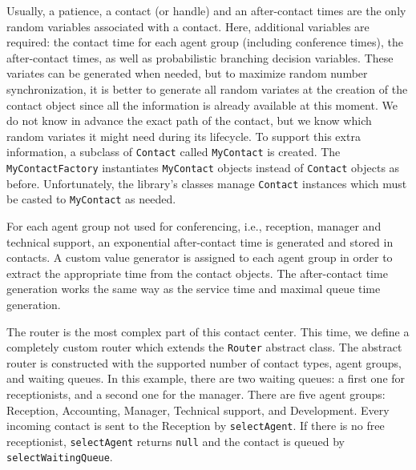 Usually, a patience, a contact (or handle) and an after-contact times
are the
only random variables associated with a contact.  Here, additional
variables are required: the contact time for each agent group
(including conference times), the
after-contact times, as well as probabilistic
branching decision variables.  These variates can be generated when
needed, but to maximize random number synchronization, it is better to
generate all random variates at the creation of the contact object
since all the information is already available at this moment.
We do not know in advance the exact path of the contact, but we know
which random variates it might need during its lifecycle.
To support this extra information, a
subclass of \texttt{Contact} called \texttt{My\-Contact} is created.
The \texttt{My\-Contact\-Factory}
instantiates \texttt{My\-Contact} objects instead of \texttt{Contact}
objects as before.  Unfortunately, the library's classes manage
\texttt{Contact} instances which must be casted to \texttt{My\-Contact}
as needed.

For each agent group not used for conferencing, i.e., reception,
manager and technical support, an exponential after-contact time is
generated and stored in contacts.  A custom value generator is
assigned to each agent group in
order to extract the appropriate time from the contact objects.
The after-contact time generation works the same way as the service
time and maximal queue time generation.

The router is the most complex part of this contact center.  This time,
we define a completely custom router which extends the \texttt{Router}
abstract class.  The abstract router is constructed with the supported
number of contact types, agent groups, and waiting queues.  In this
example, there are two waiting queues: a first one for
receptionists, and a
second one for the manager.  There are five agent groups: Reception,
Accounting,
Manager, Technical support, and Development.
Every incoming contact is
sent to the Reception by \texttt{select\-Agent}.
If there is no free
receptionist, \texttt{select\-Agent} returns \texttt{null} and the contact
is queued by \texttt{select\-Waiting\-Queue}.

